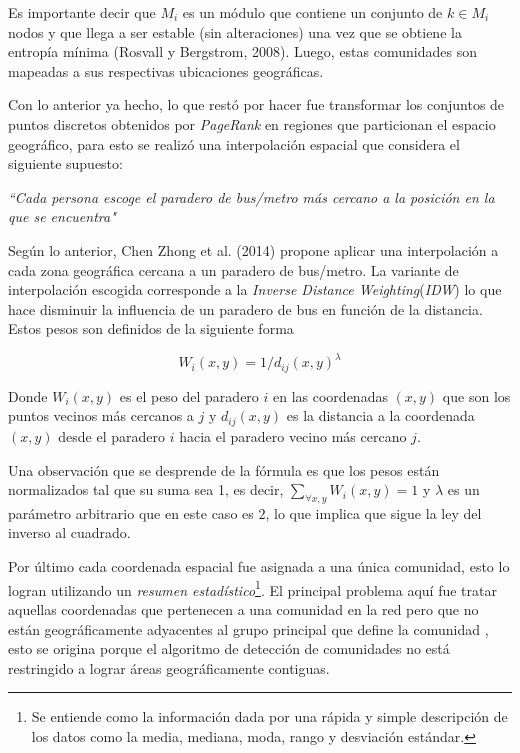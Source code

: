 \documentclass[12pt]{article}
\begin{document}
Es importante decir que $M_i$ es un módulo que contiene un conjunto de $k \in M_i$ nodos y que llega a ser estable (sin alteraciones) una vez que se obtiene la entropía mínima (Rosvall y Bergstrom, 2008). Luego, estas comunidades son mapeadas a sus respectivas ubicaciones geográficas.

Con lo anterior ya hecho, lo que restó por hacer fue transformar los conjuntos de puntos discretos obtenidos por \textit{PageRank} en regiones que particionan el espacio geográfico, para esto se realizó una interpolación espacial que considera el siguiente supuesto:

\begin{center}
	\textit{``Cada persona escoge el paradero de bus/metro más cercano a la posición en la que se encuentra"}
\end{center} 

Según lo anterior, Chen Zhong et al. (2014) propone aplicar una interpolación a cada zona geográfica cercana a un paradero de bus/metro. La variante de interpolación escogida corresponde a la \textit{Inverse Distance Weighting}(\textit{IDW}) lo que hace disminuir la influencia de un paradero de bus en función de la distancia. Estos pesos son definidos de la siguiente forma 

$$
	W_i(x,y) = 1/d_{ij} (x,y)^\lambda
$$

Donde $W_i(x,y)$ es el peso del paradero $i$ en las coordenadas $(x,y)$ que son los puntos vecinos más cercanos a $j$ y $d_{ij} (x,y)$ es la distancia a la coordenada $(x,y)$ desde el paradero $i$ hacia el paradero vecino más cercano $j$.

Una observación que se desprende de la fórmula es que los pesos están normalizados tal que su suma sea 1, es decir, $\sum_{\forall x,y} W_i (x,y)=1$ y $\lambda$ es un parámetro arbitrario que en este caso es $2$, lo que implica que sigue la ley del inverso al cuadrado.

Por último cada coordenada espacial fue asignada a una única comunidad, esto lo logran utilizando un  \textit{resumen estadístico}\footnote{Se entiende como la información dada por una rápida y simple descripción de los datos como la media, mediana, moda, rango y desviación estándar.}. El principal problema aquí fue tratar aquellas coordenadas que pertenecen a una comunidad en la red pero que no están geográficamente adyacentes al grupo principal que define la comunidad	, esto se origina porque el algoritmo de detección de comunidades no está restringido a lograr áreas geográficamente contiguas.
\end{document}

